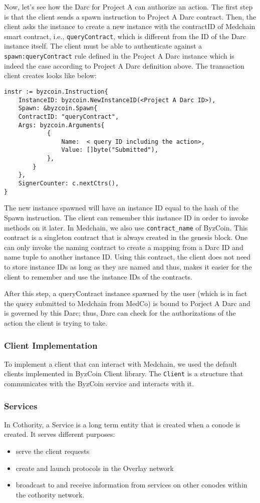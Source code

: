 Now, let's see how the Darc for Project A can authorize an action. The first step is that the client sends a spawn instruction to Project A Darc contract. Then, the client asks the instance to create a new instance with the contractID of Medchain smart contract, i.e., \texttt{queryContract}, which is different from the ID of the Darc instance itself. The client must be able to authenticate against a \texttt{spawn:queryContract} rule defined in the Project A Darc instance which is indeed the case according to Project A Darc definition above. The transaction client creates looks like below:

\begin{verbatim}
instr := byzcoin.Instruction{
    InstanceID: byzcoin.NewInstanceID(<Project A Darc ID>),
    Spawn: &byzcoin.Spawn{
    ContractID: "queryContract",
    Args: byzcoin.Arguments{
		    {
		        Name:  < query ID including the action>,
		        Value: []byte("Submitted"), 
		    },
        }  
    },
    SignerCounter: c.nextCtrs(),
}
\end{verbatim}

The new instance spawned will have an instance ID equal to the hash of the Spawn instruction. The client can remember this instance ID in order to invoke methods on it later. In Medchain, we also use \texttt{contract\_name} of ByzCoin. This contract is a singleton contract that is always created in the genesis block. One can only invoke the naming contract to create a mapping from a Darc ID and name tuple to another instance ID. Using this contract, the client does not need to store instance IDs as long as they are named and thus, makes it easier for the client to remember and use the instance IDs of the contracts.

After this step, a queryContract instance spawned by the user (which is in fact the query submitted to Medchain from MedCo) is bound to Porject A Darc and is governed by this Darc; thus, Darc can check for the authorizations of the action the client is trying to take. 

\subsubsection{Client Implementation} \label{impl:client}
To implement a client that can interact with Medchain, we used the default clients  implemented in ByzCoin Client library. The \texttt{Client} is a structure that communicates with the ByzCoin service and interacts with it. 

\subsubsection{Services} \label{impl:services}
In Cothority, a Service is a long term entity that is created when a conode is created. It serves different purposes:
\begin{itemize}
    \item serve the client requests
    \item create and launch protocols in the Overlay network
    \item broadcast to and receive information from services on other conodes within the cothority network. 
\end{itemize}

